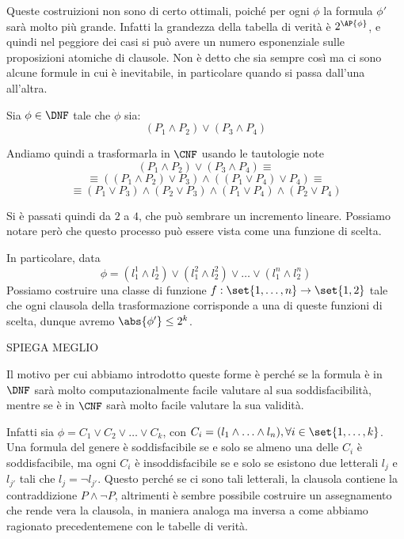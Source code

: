 Queste costruizioni non sono di certo ottimali, poiché per ogni \(\phi\) la formula \(\phi'\) sarà molto più grande. Infatti la grandezza della tabella di verità è \(2^{\AP{\phi}}\), e quindi nel peggiore dei casi si può avere un numero esponenziale sulle proposizioni atomiche di clausole. Non è detto che sia sempre così ma ci sono alcune formule in cui è inevitabile, in particolare quando si passa dall'una all'altra.

\begin{example}{}
  Sia \(\phi \in\DNF\) tale che \(\phi\) sia:
  \[(P_1 \land P_2)\lor (P_3 \land P_4)\]

  Andiamo quindi a trasformarla in \(\CNF\) usando le tautologie note
  \[(P_1 \land P_2)\lor (P_3 \land P_4)\equiv\]
  \[\equiv ((P_1 \land P_2)\lor P_3)\land((P_1 \lor P_4)\lor P_4)\equiv\]
  \[\equiv (P_1 \lor P_3) \land (P_2 \lor P_3) \land (P_1 \lor P_4) \land (P_2 \lor P_4)\]

  Si è passati quindi da \(2\) a \(4\), che può sembrare un incremento lineare. Possiamo notare però che questo processo può essere vista come una funzione di scelta.

  In particolare, data
  \[\phi = (l_1^1 \land l_2^1) \lor (l_1^2 \land l_2^2) \lor\ldots\lor (l_1^n \land l_2^n)\]
  Possiamo costruire una classe di funzione \(f: \set{1,\ldots,n}\to \set{1,2}\) tale che ogni clausola della trasformazione corrisponde a una di queste funzioni di scelta, dunque avremo \(\abs{\phi'}\leq 2^{k}\).

  SPIEGA MEGLIO
\end{example}

Il motivo per cui abbiamo introdotto queste forme è perché se la formula è in \(\DNF\) sarà molto computazionalmente facile valutare al sua soddisfacibilità, mentre se è in \(\CNF\) sarà molto facile valutare la sua validità.

Infatti sia \(\phi = C_1 \lor C_2 \lor\ldots\lor C_k\), con \(C_i = (l_1 \land \ldots \land l_n), \forall i \in \set{1,\ldots, k}\). Una formula del genere è soddisfacibile se e solo se almeno una delle \(C_i\) è soddisfacibile, ma ogni \(C_i\) è insoddisfacibile se e solo se esistono due letterali \(l_j\) e \(l_{j'}\) tali che \(l_j = \neg l_{j'}\). Questo perché se ci sono tali letterali, la clausola contiene la contraddizione \(P \land \neg P\), altrimenti è sembre possibile costruire un assegnamento che rende vera la clausola, in maniera analoga ma inversa a come abbiamo ragionato precedentemene con le tabelle di verità.

